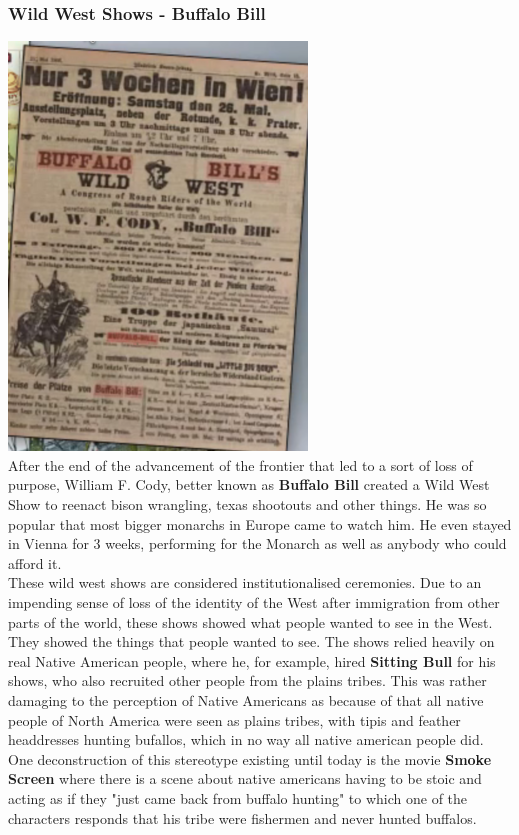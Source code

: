 \documentclass{article}
\begin{document}
	\subsubsection{Wild West Shows - Buffalo Bill}
	\includegraphics{Buffalo_Bill.png} \\
	After the end of the advancement of the frontier that led to a sort of loss of purpose, William F. Cody, better known as \textbf{Buffalo Bill} created a Wild West Show to reenact bison wrangling, texas shootouts and other things. He was so popular that most bigger monarchs in Europe came to watch him. He even stayed in Vienna for 3 weeks, performing for the Monarch as well as anybody who could afford it. \\
	These wild west shows are considered institutionalised ceremonies. Due to an impending sense of loss of the identity of the West after immigration from other parts of the world, these shows showed what people wanted to see in the West. They showed the things that people wanted to see. The shows relied heavily on real Native American people, where he, for example, hired \textbf{Sitting Bull} for his shows, who also recruited other people from the plains tribes. This was rather damaging to the perception of Native Americans as because of that all native people of North America were seen as plains tribes, with tipis and feather headdresses hunting bufallos, which in no way all native american people did. One deconstruction of this stereotype existing until today is the movie \textbf{Smoke Screen} where there is a scene about native americans having to be stoic and acting as if they "just came back from buffalo hunting" to which one of the characters responds that his tribe were fishermen and never hunted buffalos. \\
\end{document}
